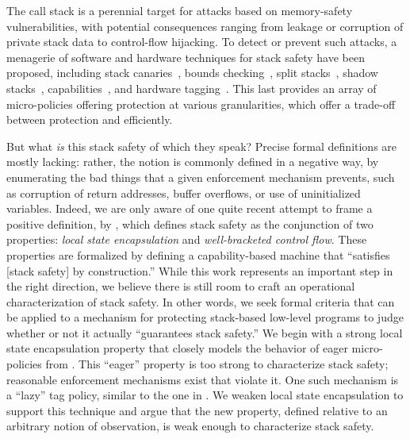 \documentclass[acmsmall,review,anonymous]{acmart}\settopmatter{printfolios=true,printccs=false,printacmref=false}
\begin{document}
The call stack is a perennial target for attacks
based on memory-safety vulnerabilities, with potential consequences
ranging from leakage or corruption of private stack data to
control-flow hijacking. To detect or prevent such attacks, a menagerie of
software and hardware techniques for stack safety have been proposed,
%
including stack canaries~\citep{Cowan+98},
bounds checking~\citep{NagarakatteZMZ09,NagarakatteZMZ10,DeviettiBMZ08},
split stacks~\citep{Kuznetsov+14},
shadow stacks~\citep{Dang+15,Shanbhogue+19},
capabilities~\citep{Woodruff+14,Chisnall+15,Skorstengaard+19,Skorstengaard+19b},
and hardware tagging~\citep{DBLP:conf/sp/RoesslerD18}. \ifaftersubmission{}
\fi
This last provides an array of micro-policies offering protection at various granularities,
which offer a trade-off between protection and efficiently.

But what {\em is} this stack safety of which they speak? Precise formal
definitions are mostly lacking: rather, the notion is commonly defined in a
negative way, by enumerating the bad things that a given enforcement mechanism
prevents, such as corruption of return addresses, buffer overflows, or
use of uninitialized variables.
Indeed, we are only aware of one quite recent attempt to frame a positive definition, by
\citet{Skorstengaard+19}, which defines stack safety as the conjunction of two properties:
{\em local state encapsulation} and {\em well-bracketed control flow}.
These properties are formalized by defining a capability-based machine
that ``satisfies [stack safety] by construction.''
%
While this work represents an important step in the right direction, we believe
there is still room to craft an operational characterization
of stack safety. In other words, we seek formal criteria that can be applied
to a mechanism for protecting stack-based low-level programs to judge
whether or not it actually ``guarantees stack safety.'' We begin with a strong
local state encapsulation property that closely models the behavior of eager
micro-policies from \citet{DBLP:conf/sp/RoesslerD18}. This ``eager'' property
is too strong to characterize stack safety; reasonable enforcement mechanisms
exist that violate it. One such mechanism is a ``lazy'' tag policy, similar to
the one in \citet{DBLP:conf/sp/RoesslerD18}. We weaken local state encapsulation
to support this technique and argue that the new property, defined relative to an
arbitrary notion of observation, is weak enough to characterize stack safety.
\end{document}
